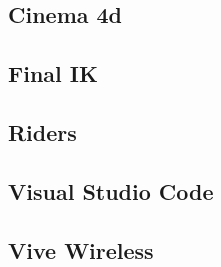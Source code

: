 \subsection{Cinema 4d}
\lipsum[5-12]

\subsection{Final IK}
\lipsum[5-12]

\subsection{Riders}
\lipsum[5-12]

\subsection{Visual Studio Code}
\lipsum[5-12]

\subsection{Vive Wireless}
\lipsum[5-12]

